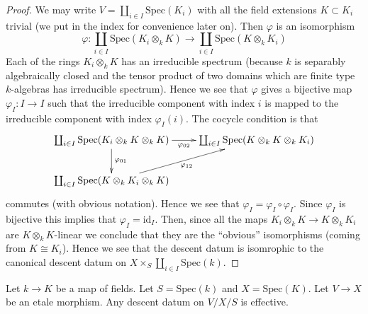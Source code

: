 \begin{proof}
We may write $V = \coprod_{i \in I} \text{Spec}(K_i)$
with all the field extensions $K \subset K_i$ trivial
(we put in the index for convenience later on).
Then $\varphi$ is an isomorphism
$$
\varphi :
\coprod_{i \in I} \text{Spec}(K_i \otimes_k K)
\longrightarrow
\coprod_{i \in I} \text{Spec}(K \otimes_k K_i)
$$
Each of the rings $K_i \otimes_k K$ has an irreducible
spectrum (because $k$ is separably algebraically closed
and the tensor product of two domains which are 
finite type $k$-algebras has irreducible spectrum).
Hence we see that $\varphi$ gives a bijective map
$\varphi_I : I \to I$ such that the irreducible component
with index $i$ is mapped to the irreducible component with
index $\varphi_I(i)$. The cocycle condition is that
$$
\xymatrix{
\coprod_{i \in I} \text{Spec}(K_i \otimes_k K \otimes_k K)
\ar[d]^{\varphi_{01}} \ar[r]_{\varphi_{02}} &
\coprod_{i \in I} \text{Spec}(K \otimes_k K \otimes_k K_i)\\
\coprod_{i \in I} \text{Spec}(K \otimes_k K_i \otimes_k K)
\ar[ru]_{\varphi_{12}}
}
$$
commutes (with obvious notation). Hence we see that
$\varphi_I = \varphi_I \circ \varphi_I$. Since $\varphi_I$ is
bijective this implies that $\varphi_I = \text{id}_I$.
Then, since all the maps $K_i \otimes_k K \to K \otimes_k K_i$
are $K \otimes_k K$-linear we conclude that they are the
``obvious'' isomorphisms (coming from $K \cong K_i$).
Hence we see that the descent datum is isomrophic to
the canonical descent datum on $X \times_S \coprod_{i \in I} \text{Spec}(k)$.
\end{proof}

\begin{lemma}
\label{lemma-descent-etale-map-fields}
Let $k \to K$ be a map of fields.
Let $S = \text{Spec}(k)$ and $X = \text{Spec}(K)$.
Let $V \to X$ be an etale morphism. Any descent datum
on $V/X/S$ is effective.
\end{lemma}

